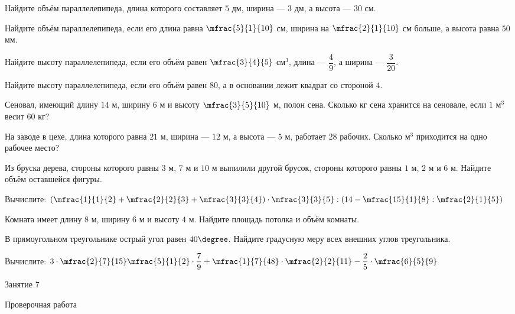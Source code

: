 \begin{class}[number=6]
	\begin{listofex}
		\item Найдите объём параллелепипеда, длина которого составляет \( 5 \) дм, ширина --- \( 3 \) дм, а высота --- \( 30 \) см.
		\item Найдите объём параллелепипеда, если его длина равна \( \mfrac{5}{1}{10} \) см, ширина на \( \mfrac{2}{1}{10} \) см больше, а высота равна \( 50 \) мм.
		\item Найдите высоту параллелепипеда, если его объём равен \( \mfrac{3}{4}{5} \) см\( ^3 \), длина --- \( \dfrac{4}{9} \), а ширина --- \( \dfrac{3}{20} \).
		\item Найдите высоту параллелепипеда, если его объём равен \( 80 \), а в основании лежит квадрат со стороной \( 4 \).
		\item Сеновал, имеющий длину \( 14 \) м, ширину \( 6 \) м и высоту \( \mfrac{3}{5}{10} \) м, полон сена. Сколько кг сена хранится на сеновале, если \( 1 \) м\( ^3 \) весит \( 60 \) кг?
		\item На заводе в цехе, длина которого равна \( 21 \) м, ширина --- \( 12 \) м, а высота --- \( 5 \) м, работает \( 28 \) рабочих. Сколько м\( ^3 \) приходится на одно рабочее место?
		\item Из бруска дерева, стороны которого равны \( 3 \) м, \( 7 \) м и \( 10 \) м выпилили другой брусок, стороны которого равны \( 1 \) м, \( 2 \) м и \( 6 \) м. Найдите объём оставшейся фигуры.
		\item Вычислите: \quad \( \left( \mfrac{1}{1}{2}+\mfrac{2}{2}{3}+\mfrac{3}{3}{4} \right)\cdot\mfrac{3}{3}{5}:\left( 14-\mfrac{15}{1}{8}:\mfrac{2}{1}{5} \right) \)
	\end{listofex}
\end{class}

\begin{homework}[number=3]
	\begin{listofex}
		\item Комната имеет длину \( 8 \) м, ширину \( 6 \) м и высоту \( 4 \) м. Найдите площадь потолка и объём комнаты.
		\item В прямоугольном треугольнике острый угол равен \( 40\degree \). Найдите градусную меру всех внешних углов треугольника.
		\item Вычислите: \quad \( 3\cdot\mfrac{2}{7}{15}\mfrac{5}{1}{2}\cdot\dfrac{7}{9}+\mfrac{1}{7}{48}\cdot\mfrac{2}{2}{11}-\dfrac{2}{5}\cdot\mfrac{6}{5}{9} \)
	\end{listofex}
\end{homework}

\begin{class}[number=7]
	\begin{listofex}
		\item Занятие 7
	\end{listofex}
\end{class}

\begin{exam}
	\begin{listofex}
		\item Проверочная работа
	\end{listofex}
\end{exam}
